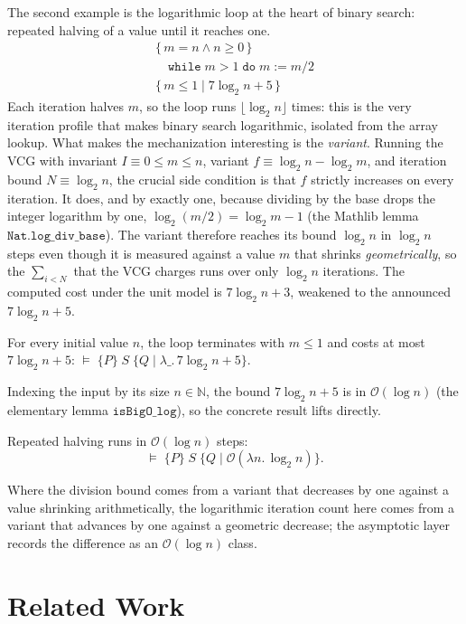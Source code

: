 \documentclass[runningheads]{llncs}
\newcommand{\Nat}{\mathbb{N}}
\newcommand{\triple}[4]{\{#1\}\;#2\;\{#3 \mid #4\}}
\newcommand{\Valid}{\vDash}
\newcommand{\BigO}{\mathcal{O}}
\newcommand{\code}[1]{\texttt{#1}}
\begin{document}
The second example is the logarithmic loop at the heart of binary search:
repeated halving of a value until it reaches one.
\[
\begin{array}{l}
\{\,m = n \wedge n \ge 0\,\}\\
\quad \code{while}\;m > 1\;\code{do}\;m := m / 2\\
\{\,m \le 1 \mid 7\log_2 n + 5\,\}
\end{array}
\]
Each iteration halves $m$, so the loop runs $\lfloor\log_2 n\rfloor$
times: this is
the very iteration profile that makes binary search logarithmic,
isolated from the
array lookup.
What makes the mechanization interesting is the \emph{variant}.
Running the VCG with invariant $I \equiv 0 \le m \le n$, variant
$f \equiv \log_2 n - \log_2 m$, and iteration bound $N \equiv \log_2
n$, the crucial
side condition is that $f$ strictly increases on every iteration.
It does, and by exactly one, because dividing by the base drops the integer
logarithm by one, $\log_2(m / 2) = \log_2 m - 1$ (the Mathlib lemma
$\code{Nat.log\_div\_base}$).
The variant therefore reaches its bound $\log_2 n$ in $\log_2 n$
steps even though
it is measured against a value $m$ that shrinks \emph{geometrically}, so the
$\sum_{i < N}$ that the VCG charges runs over only $\log_2 n$ iterations.
The computed cost under the unit model is $7\log_2 n + 3$, weakened
to the announced
$7\log_2 n + 5$.

\begin{theorem}[\code{halving\_valid}]
For every initial value $n$, the loop terminates with $m \le 1$ and costs at
most $7\log_2 n + 5$:
$\Valid\;\triple{P}{S}{Q}{\lambda\_. \,7\log_2 n + 5}$.
\end{theorem}
Indexing the input by its size $n \in \Nat$, the bound $7\log_2 n + 5$ is in
$\BigO(\log n)$ (the elementary lemma $\code{isBigO\_log}$), so the
concrete result
lifts directly.

\begin{corollary}[\code{halving\_bigO}]
Repeated halving runs in $\BigO(\log n)$ steps:
\[ \Valid\;\triple{P}{S}{Q}{\BigO(\lambda n.\,\log_2 n)}. \]
\end{corollary}
Where the division bound comes from a variant that decreases by one against a
value shrinking arithmetically, the logarithmic iteration count here
comes from a
variant that advances by one against a geometric decrease; the asymptotic layer
records the difference as an $\BigO(\log n)$ class.

\section{Related Work}\label{sec:related}
\end{document}
